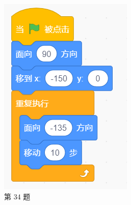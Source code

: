 \documentclass[10pt, a4paper]{article}
\begin{document}
\begin{enumerate}
\begin{figure}[htbp]
\begin{minipage}[t]{.45\textwidth}
\begin{minipage}[t]{.48\textwidth}
                \end{minipage}
                \caption*{第 34 题}
            \end{minipage}
            \begin{minipage}[t]{.35\textwidth}
                \centering
                \begin{minipage}[t]{.48\textwidth}
                    \centering
                    \includegraphics[width=\textwidth]{35-1.png}
                \end{minipage}
                \begin{minipage}[t]{.48\textwidth}
                    \centering

\end{minipage}
\end{minipage}
\end{figure}
\end{enumerate}
\end{document}
